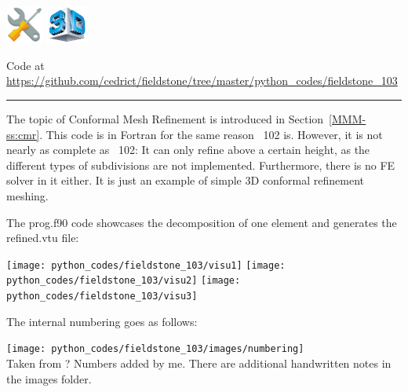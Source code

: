 \includegraphics[height=1.25cm]{images/pictograms/tools}
\includegraphics[height=1.25cm]{images/pictograms/3d}




\begin{center}
Code at \url{https://github.com/cedrict/fieldstone/tree/master/python_codes/fieldstone_103}
\end{center}

\par\noindent\rule{\textwidth}{0.4pt}


The topic of Conformal Mesh Refinement is introduced in Section~\ref{MMM-ss:cmr}.
This code is in Fortran for the same reason \stone~102 is. 
However, it is not nearly as complete as \stone~102: It can only refine 
above a certain height, as the different types of subdivisions are not implemented.
Furthermore, there is no FE solver in it either. It is just an example of 
simple 3D conformal refinement meshing.

The {\filenamefont prog.f90} code showcases the decomposition of one element and generates
the {\filenamefont refined.vtu} file:
\begin{center}
\texttt{[image: python\_codes/fieldstone\_103/visu1]}
\texttt{[image: python\_codes/fieldstone\_103/visu2]}
\texttt{[image: python\_codes/fieldstone\_103/visu3]}
\end{center}
The internal numbering goes as follows:
\begin{center}
\texttt{[image: python\_codes/fieldstone\_103/images/numbering]}\\
{\captionfont Taken from ? Numbers added by me. There are additional handwritten notes
in the images folder.}
\end{center}

